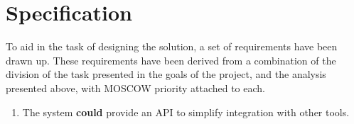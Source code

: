 \clearpage
\section{Specification}

To aid in the task of designing the solution, a set of requirements have
been drawn up. These requirements have been derived from a combination of the
division of the task presented in the goals of the project, and the analysis
presented above, with MOSCOW priority attached to each.

\begin{enumerate}
    \setlength{\itemsep}{1pt}
    \item The system \textbf{could} provide an API to simplify integration with other tools.
\end{enumerate}
